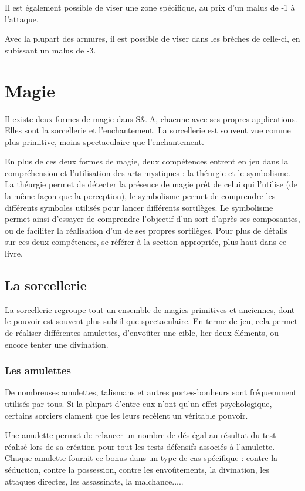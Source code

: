 \documentclass[10pt,a4paper,twocolumn]{book}
\begin{document}
Il est également possible de viser une zone spécifique, au prix d’un malus de -1 à l’attaque.

Avec la plupart des armures, il est possible de viser dans les brèches de celle-ci, en subissant un malus de -3.

\section{Magie}
Il existe deux formes de magie dans S\& A, chacune avec ses propres applications. Elles sont la sorcellerie et l'enchantement. La sorcellerie est souvent vue comme plus primitive, moins spectaculaire que l'enchantement.

En plus de ces deux formes de magie, deux compétences entrent en jeu dans la compréhension et l'utilisation des arts mystiques : la théurgie et le symbolisme. La théurgie permet de détecter la présence de magie prêt de celui qui l'utilise (de la même façon que la perception), le symbolisme permet de comprendre les différents symboles utilisés pour lancer différents sortilèges. Le symbolisme permet ainsi d'essayer de comprendre l'objectif d'un sort d'après ses composantes, ou de faciliter la réalisation d'un de ses propres sortilèges. Pour plus de détails sur ces deux compétences, se référer à la section appropriée, plus haut dans ce livre.

\subsection{La sorcellerie}
La sorcellerie regroupe tout un ensemble de magies primitives et anciennes, dont le pouvoir est souvent plus subtil que spectaculaire. En terme de jeu, cela permet de réaliser différentes amulettes, d'envoûter une cible, lier deux éléments, ou encore tenter une divination.
\subsubsection{Les amulettes}
De nombreuses amulettes, talismans et autres portes-bonheurs sont fréquemment utilisés par tous. Si la plupart d'entre eux n'ont qu'un effet psychologique, certains sorciers clament que les leurs recèlent un véritable pouvoir.

Une amulette permet de relancer un nombre de dés égal au résultat du test réalisé lors de sa création pour tout les tests défensifs associés à l'amulette. Chaque amulette fournit ce bonus dans un type de cas spécifique : contre la séduction, contre la possession, contre les envoûtements, la divination, les attaques directes, les assassinats, la malchance..... 
\end{document}
